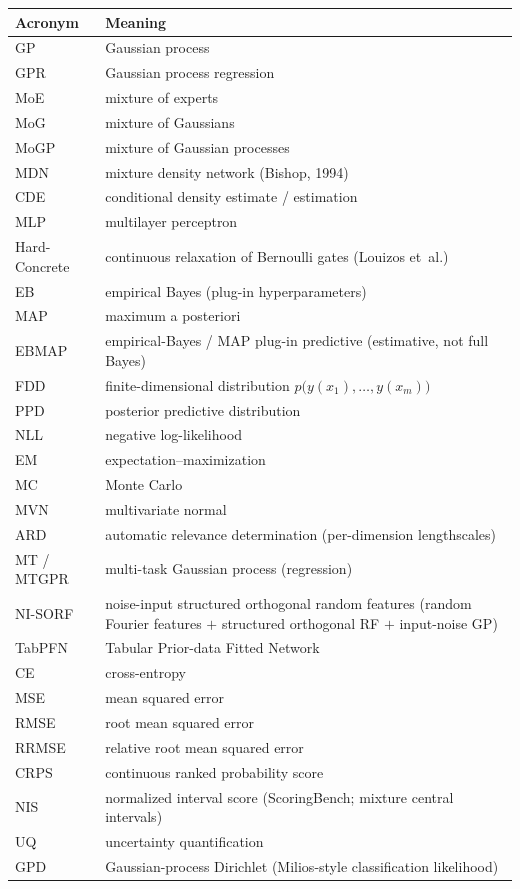 \documentclass[11pt,a4paper]{article}
\theoremstyle{definition}
\begin{document}
\begin{center}
\renewcommand{\arraystretch}{1.12}
\small
\begin{tabular}{@{}lp{10.2cm}@{}}
\toprule
Acronym & Meaning \\
\midrule
GP & Gaussian process \\
GPR & Gaussian process regression \\
MoE & mixture of experts \\
MoG & mixture of Gaussians \\
MoGP & mixture of Gaussian processes \\
MDN & mixture density network (Bishop, 1994) \\
CDE & conditional density estimate / estimation \\
MLP & multilayer perceptron \\
Hard-Concrete & continuous relaxation of Bernoulli gates (Louizos et~al.) \\
EB & empirical Bayes (plug-in hyperparameters) \\
MAP & maximum a posteriori \\
EBMAP & empirical-Bayes / MAP plug-in predictive (estimative, not full Bayes) \\
FDD & finite-dimensional distribution
  $p\bigl(y(x_1),\ldots,y(x_m)\bigr)$ \\
PPD & posterior predictive distribution \\
NLL & negative log-likelihood \\
EM & expectation--maximization \\
MC & Monte Carlo \\
MVN & multivariate normal \\
ARD & automatic relevance determination (per-dimension lengthscales) \\
MT / MTGPR & multi-task Gaussian process (regression) \\
NI-SORF & noise-input structured orthogonal random features
  (random Fourier features $+$ structured orthogonal RF $+$ input-noise GP) \\
TabPFN & Tabular Prior-data Fitted Network \\
CE & cross-entropy \\
MSE & mean squared error \\
RMSE & root mean squared error \\
RRMSE & relative root mean squared error \\
CRPS & continuous ranked probability score \\
NIS & normalized interval score (ScoringBench; mixture central intervals) \\
UQ & uncertainty quantification \\
GPD & Gaussian-process Dirichlet (Milios-style classification likelihood) \\
\bottomrule
\end{tabular}
\end{center}
\end{document}
